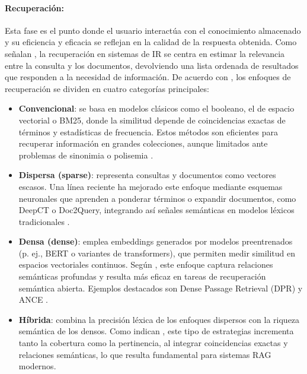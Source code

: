 \paragraph{Recuperación:} Esta fase es el punto donde el usuario interactúa con el conocimiento almacenado y su eficiencia y eficacia se reflejan en la calidad 
de la respuesta obtenida. Como señalan \textcite{fan2021pretraining}, la recuperación en sistemas de IR se centra en estimar la relevancia entre la consulta y los documentos, devolviendo una lista ordenada
de resultados que responden a la necesidad de información.  
De acuerdo con \textcite{hambarde2023ir}, los enfoques de recuperación se dividen en cuatro categorías principales:

\begin{itemize}
    \item \textbf{Convencional}: se basa en modelos clásicos como el booleano, el de espacio vectorial o BM25, donde la similitud depende de coincidencias exactas de términos y estadísticas de frecuencia. Estos métodos son eficientes para recuperar información en grandes colecciones, aunque limitados ante problemas de sinonimia o polisemia \parencite{hambarde2023ir}.
    
    \item \textbf{Dispersa (sparse)}: representa consultas y documentos como vectores escasos. Una línea reciente ha mejorado este enfoque mediante esquemas neuronales que aprenden a ponderar términos o expandir documentos, como DeepCT o Doc2Query, integrando así señales semánticas en modelos léxicos tradicionales \parencite{hambarde2023ir,gao2023rag}. 
    
    \item \textbf{Densa (dense)}: emplea embeddings generados por modelos preentrenados (p. ej., BERT o variantes de transformers), que permiten medir similitud en espacios vectoriales continuos. Según \textcite{hu2024ragrau}, este enfoque captura relaciones semánticas profundas y resulta más eficaz en tareas de recuperación semántica abierta. Ejemplos destacados son Dense Passage Retrieval (DPR) y ANCE \parencite{hambarde2023ir}. 
    
    \item \textbf{Híbrida}: combina la precisión léxica de los enfoques dispersos con la riqueza semántica de los densos. Como indican \textcite{zhai2024llmIR}, este tipo de estrategias incrementa tanto la cobertura como la pertinencia, al integrar coincidencias exactas y relaciones semánticas, lo que resulta fundamental para sistemas RAG modernos.
\end{itemize}


